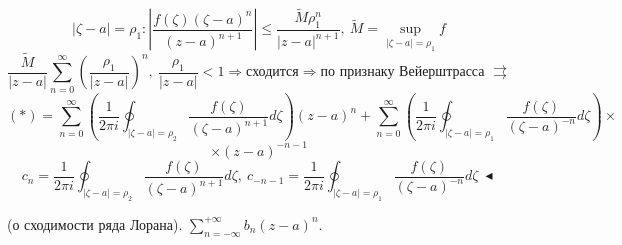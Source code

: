 \[|\zeta-a|=\rho_1:\left|\frac{f(\zeta )(\zeta -a)^n}{(z-a)^{n+1}}\right| \leq \frac{\widetilde{M} \rho_1^n}{|z-a|^{n+1}}, \ \widetilde{M} = \sup_{|\zeta-a|=\rho_1}f\]
\[\frac{\widetilde{M}}{|z-a|}\sum_{n=0}^\infty \left(\frac{\rho_1}{|z-a|}\right)^n, \ \frac{\rho_1}{|z-a|} < 1 \Rightarrow \text{сходится} \Rightarrow \text{по признаку Вейерштрасса } \rightrightarrows\]
\[(*) = \sum_{n=0}^\infty \left(\frac{1}{2\pi i} \oint_{|\zeta-a|=\rho_2} \frac{f(\zeta)}{(\zeta-a)^{n+1}} d\zeta \right) (z-a)^n + \sum_{n=0}^\infty \left(\frac{1}{2\pi i}\oint_{|\zeta-a|=\rho_1}\frac{f(\zeta)}{(\zeta-a)^{-n}} d\zeta\right) \times\]
\[\times (z-a)^{-n-1}\]
\[c_n = \frac{1}{2\pi i} \oint_{|\zeta-a|=\rho_2} \frac{f(\zeta)}{(\zeta-a)^{n+1}} d\zeta, \ c_{-n-1} = \frac{1}{2\pi i}\oint_{|\zeta-a|=\rho_1}\frac{f(\zeta)}{(\zeta-a)^{-n}} d\zeta \ \blacktriangleleft\]

 (о сходимости ряда Лорана). $\sum_{n=-\infty}^{+\infty} b_n (z-a)^n.$

